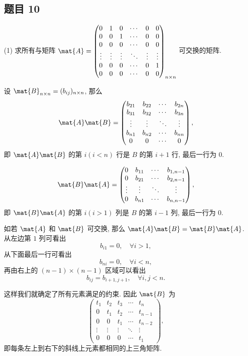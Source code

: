 \newpage
\subsection*{题目 10}
\begin{problem*}
(1) 求所有与矩阵 $\mat{A} = \begin{pmatrix}
    0 & 1 & 0 & \cdots & 0 & 0 \\
    0 & 0 & 1 & \cdots & 0 & 0 \\
    0 & 0 & 0 & \cdots & 0 & 0 \\
    \vdots & \vdots & \vdots & \ddots & \vdots & \vdots \\
    0 & 0 & 0 & \cdots & 0 & 1 \\
    0 & 0 & 0 & \cdots & 0 & 0
\end{pmatrix}_{n \times n}$ 可交换的矩阵.
\end{problem*}
\begin{solution}
设 $\mat{B}_{n \times n} = (b_{ij})_{n \times n}$, 那么
\[
\mat{A}\mat{B} = 
\begin{pmatrix}
    b_{21} & b_{22} & \cdots & b_{2n} \\
    b_{31} & b_{32} & \cdots & b_{3n} \\
    \vdots & \vdots & \ddots & \vdots \\
    b_{n1} & b_{n2} & \cdots & b_{nn} \\
    0 & 0 & \cdots & 0 
\end{pmatrix},
\]
即 $\mat{A}\mat{B}$ 的第 $i(i < n)$ 行是 $B$ 的第 $i + 1$ 行, 最后一行为 $0$.

\[
\mat{B}\mat{A} = 
\begin{pmatrix}
    0 & b_{11} & \cdots & b_{1, n - 1} \\
    0 & b_{21} & \cdots & b_{2, n - 1} \\
    \vdots & \vdots & \ddots & \vdots \\
    0 & b_{n1} & \cdots & b_{n, n - 1}
\end{pmatrix},
\]
即 $\mat{B}\mat{A}$ 的第 $i(i > 1)$ 列是 $B$ 的第 $i - 1$ 列, 最后一行为 $0$.

如若 $\mat{A}$ 和 $\mat{B}$ 可交换, 那么 $\mat{A}\mat{B} = \mat{B}\mat{A}$. 从左边第 $1$ 列可看出
\[
    b_{i1} = 0, \quad \forall i > 1,
\]
从下面最后一行可看出
\[
    b_{ni} = 0, \quad \forall i < n,
\]
再由右上的 $(n - 1) \times (n - 1)$ 区域可以看出
\[
    b_{ij} = b_{i + 1, j + 1}, \quad \forall i, j < n.
\]

这样我们就确定了所有元素满足的约束. 因此 $\mat{B}$ 为
\[
    \begin{pmatrix}
        t_1 & t_2 & t_3 & \cdots & t_{n} \\
        0 & t_1 & t_2 & \cdots & t_{n - 1} \\
        0 & 0 & t_1 & \cdots & t_{n - 2} \\
        \vdots & \vdots & \vdots & \ddots & \vdots \\
        0 & 0 & 0 & \cdots & t_1
    \end{pmatrix},
\]
即每条左上到右下的斜线上元素都相同的上三角矩阵.
\end{solution}

